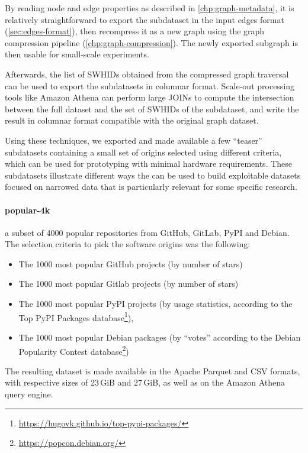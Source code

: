 By reading node and edge properties as described in
\cref{chp:graph-metadata}, it is relatively straightforward to export the
subdataset in the input edges format (\cref{sec:edges-format}), then recompress
it as a new graph using the graph compression pipeline
(\cref{chp:graph-compression}). The newly exported subgraph is then usable for
small-scale experiments.

Afterwards, the list of \glspl{SWHID} obtained from the compressed graph
traversal can be used to export the subdatasets in columnar format. Scale-out
processing tools like Amazon Athena can perform large JOINs to compute the
intersection between the full dataset and the set of \glspl{SWHID} of the
subdataset, and write the result in columnar format compatible with the
original graph dataset.

Using these techniques, we exported and made available a few ``teaser''
subdatasets containing a small set of origins selected using different
criteria, which can be used for prototyping with minimal hardware requirements.
These subdatasets illustrate different ways the \SWHGD{} can be used to build
exploitable datasets focused on narrowed data that is particularly relevant for
some specific research.

\paragraph{popular-4k} a subset of 4000 popular repositories from
GitHub, GitLab, PyPI and Debian. The selection criteria to pick the software
origins was the following:

\begin{itemize}
    \setlength\itemsep{0em}
    \item The 1000 most popular GitHub projects (by number of stars)
    \item The 1000 most popular Gitlab projects (by number of stars)
    \item The 1000 most popular PyPI projects (by usage statistics, according
        to the Top PyPI Packages
        database\footnote{\url{https://hugovk.github.io/top-pypi-packages/}}),
    \item The 1000 most popular Debian packages (by “votes” according to the
        Debian Popularity Contest
        database\footnote{\url{https://popcon.debian.org/}})
\end{itemize}

The resulting dataset is made available in the Apache Parquet and CSV formats,
with respective sizes of 23\,GiB and 27\,GiB, as well as on the Amazon Athena
query engine.

